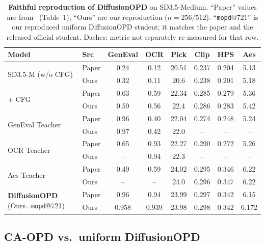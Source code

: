 \begin{table}[t]
\centering
\caption{\textbf{Faithful reproduction of DiffusionOPD} on SD3.5-Medium. ``Paper''
values are from~\cite{li2026diffusionopd} (Table~1); ``Ours'' are our reproduction
($n{=}256/512$). ``\texttt{mopd}@721'' is our reproduced uniform DiffusionOPD
student; it matches the paper and the released official student. Dashes: metric
not separately re-measured for that row.}
\label{tab:repro}
\small
\setlength{\tabcolsep}{4pt}
\begin{tabular}{llcccccc}
\toprule
\textbf{Model} & \textbf{Src} & \textbf{GenEval} & \textbf{OCR} & \textbf{Pick} & \textbf{Clip} & \textbf{HPS} & \textbf{Aes} \\
\midrule
\multirow{2}{*}{SD3.5-M (w/o CFG)} & Paper & 0.24 & 0.12 & 20.51 & 0.237 & 0.204 & 5.13 \\
                                   & Ours  & 0.32 & 0.11 & 20.6  & 0.238 & 0.201 & 5.18 \\
\multirow{2}{*}{\quad + CFG}       & Paper & 0.63 & 0.59 & 22.34 & 0.285 & 0.279 & 5.36 \\
                                   & Ours  & 0.59 & 0.56 & 22.4  & 0.286 & 0.283 & 5.42 \\
\midrule
\multirow{2}{*}{GenEval Teacher}   & Paper & 0.96 & 0.40 & 22.04 & 0.274 & 0.248 & 5.24 \\
                                   & Ours  & 0.97 & 0.42 & 22.0  & --    & --    & --   \\
\multirow{2}{*}{OCR Teacher}       & Paper & 0.65 & 0.93 & 22.27 & 0.290 & 0.272 & 5.26 \\
                                   & Ours  & --   & 0.94 & 22.3  & --    & --    & --   \\
\multirow{2}{*}{Aes Teacher}       & Paper & 0.49 & 0.59 & 24.02 & 0.295 & 0.346 & 6.22 \\
                                   & Ours  & --   & --   & 24.0  & 0.296 & 0.347 & 6.22 \\
\midrule
\multirow{2}{*}{\textbf{DiffusionOPD} (Ours=\texttt{mopd}@721)} & Paper & 0.96 & 0.94 & 23.99 & 0.297 & 0.342 & 6.15 \\
                                   & Ours  & 0.958 & 0.939 & 23.98 & 0.298 & 0.342 & 6.172 \\
\bottomrule
\end{tabular}
\end{table}

\subsection{CA-OPD vs.\ uniform DiffusionOPD}
\label{sec:exp-caopd}

